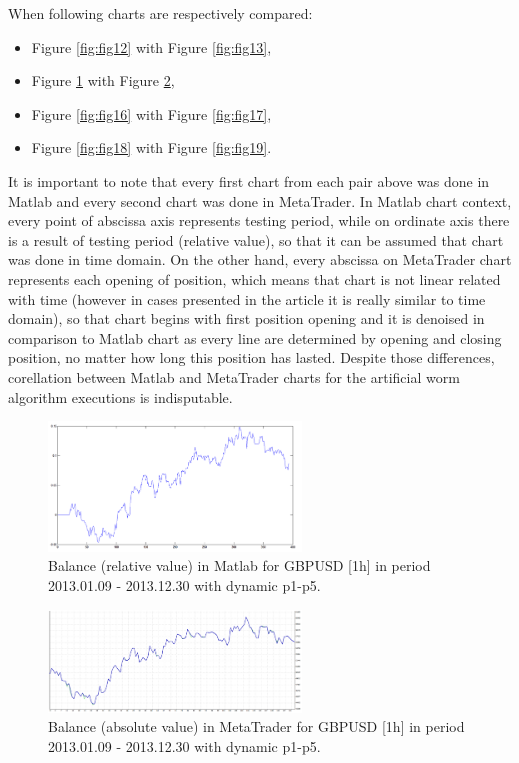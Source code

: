 \documentclass[runningheads,a4paper]{llncs}
\begin{document}
When following charts are respectively compared:
\begin{itemize}
\item Figure \ref{fig:fig12} with Figure \ref{fig:fig13},
\item Figure \ref{fig:fig14} with Figure \ref{fig:fig15},
\item Figure \ref{fig:fig16} with Figure \ref{fig:fig17},
\item Figure \ref{fig:fig18} with Figure \ref{fig:fig19}.
\end{itemize}

It is important to note that every first chart from each pair above was done in Matlab and every second chart was done in MetaTrader. In Matlab chart context, every point of abscissa axis represents testing period, while on ordinate axis there is a result of testing period (relative value), so that it can be assumed that chart was done in time domain. On the other hand, every abscissa on MetaTrader chart represents each opening of position, which means that chart is not linear related with time (however in cases presented in the article it is really similar to time domain), so that chart begins with first position opening and it is denoised in comparison to Matlab chart as every line are determined by opening and closing position, no matter how long this position has lasted. Despite those differences, corellation between Matlab and MetaTrader charts for the artificial worm algorithm executions is indisputable.

\begin{figure}[h!]
\centering
\includegraphics[width = 0.6\textwidth]{figures/rys14.png}
\caption{Balance (relative value) in Matlab for GBPUSD [1h] in period 2013.01.09 - 2013.12.30 with dynamic p1-p5.}
\label{fig:fig14}
\end{figure}
\FloatBarrier
\begin{figure}[h!]
\centering
\includegraphics[width = 0.6\textwidth]{figures/rys15.png}
\caption{Balance (absolute value) in MetaTrader for GBPUSD [1h] in period 2013.01.09 - 2013.12.30 with dynamic p1-p5.}
\label{fig:fig15}
\end{figure}
\FloatBarrier
\end{document}
